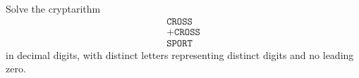 Solve the cryptarithm
\[
\begin{array}{r}
\texttt{CROSS}\\
+\texttt{CROSS}\\ \hline
\texttt{SPORT}
\end{array}
\]
in decimal digits, with distinct letters representing distinct digits and no leading zero.
